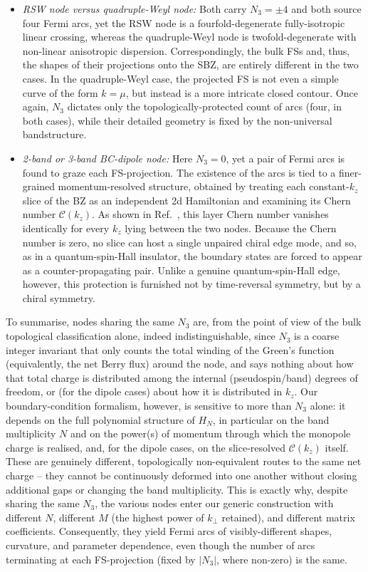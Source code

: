 \documentclass[aps,prb,onecolumn, footinbib, 10pt]{revtex4-2}
\begin{document}
{{\begin{itemize}
\item \textit{RSW node versus quadruple-Weyl node:} Both carry $N_3=\pm4$ and both source four Fermi arcs, yet the RSW node is a fourfold-degenerate fully-isotropic linear crossing, whereas the quadruple-Weyl node is twofold-degenerate with non-linear anisotropic dispersion. Correspondingly, the bulk FSs and, thus, the shapes of their projections onto the SBZ, are entirely different in the two cases. In the quadruple-Weyl case, the projected FS is not even a simple curve of the form $k=\mu$, but instead is a more intricate closed contour. Once again, $N_3$ dictates only the topologically-protected count of arcs (four, in both cases), while their detailed geometry is fixed by the non-universal bandstructure.

\item \textit{2-band or 3-band BC-dipole node:} Here $N_3=0$, yet a pair of Fermi arcs is found to graze each FS-projection. The existence of the arcs is tied to a finer-grained momentum-resolved structure, obtained by treating each constant-$k_z$ slice of the BZ as an independent 2d Hamiltonian and examining its Chern number $\mathcal C(k_z)$. As shown in Ref.~\cite{twoband-dipole}, this layer Chern number vanishes identically for every $k_z$ lying between the two nodes. Because the Chern number is zero, no slice can host a single unpaired chiral edge mode, and so, as in a quantum-spin-Hall insulator, the boundary states are forced to appear as a counter-propagating pair. Unlike a genuine quantum-spin-Hall edge, however, this protection is furnished not by time-reversal symmetry, but by a chiral symmetry.

\end{itemize}
To summarise, nodes sharing the same $N_3$ are, from the point of view of the bulk topological classification alone, indeed indistinguishable, since $N_3$ is a coarse integer invariant that only counts the total winding of the Green's function (equivalently, the net Berry flux) around the node, and says nothing about how that total charge is distributed among the internal (pseudospin/band) degrees of freedom, or (for the dipole cases) about how it is distributed in $k_z$. Our boundary-condition formalism, however, is sensitive to more than $N_3$ alone: it depends on the full polynomial structure of $H_N$, in particular on the band multiplicity $N$ and on the power(s) of momentum through which the monopole charge is realised, and, for the dipole cases, on the slice-resolved $\mathcal C(k_z)$ itself. These are genuinely different, topologically non-equivalent routes to the same net charge -- they cannot be continuously deformed into one another without closing additional gaps or changing the band multiplicity. This is exactly why, despite sharing the same $N_3$, the various nodes enter our generic construction with different $N$, different $M$ (the highest power of $k_\perp$ retained), and different matrix coefficients. Consequently, they yield Fermi arcs of visibly-different shapes, curvature, and parameter dependence, even though the number of arcs terminating at each FS-projection (fixed by $|N_3|$, where non-zero) is the same.

}}
\end{document}
